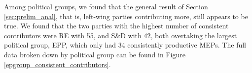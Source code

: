 \documentclass[lettersize,journal]{IEEEtran}
\begin{document}
Among political groups, we found that the general result of Section \ref{sec:prelim_anal}, that is, left-wing parties contributing more, still appears to be true. We found that the two parties with the highest number of consistent contributors were RE with 55, and S\&D with 42, both overtaking the largest political group, EPP, which only had 34 consistently productive MEPs. The full data broken down by political group can be found in Figure \ref{epgroup_consistent_contributors}.

\end{document}
